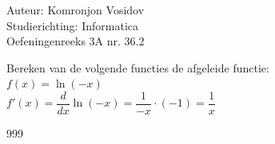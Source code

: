 \documentclass[a4paper]{article}
\begin{document}
	
	\noindent \large Auteur: Komronjon Vosidov \\
	\noindent \large Studierichting: Informatica\\
	\noindent \large Oefeningenreeks 3A nr. 36.2\\
	
	\medskip
	
	\normalsize
	Bereken van de volgende functies de afgeleide functie:\\
	
	$f(x) = \ln(-x)$\\
	
	$f'(x) = \dfrac{d}{dx} \ln(-x) = \dfrac{1}{-x} \cdot (-1) = \dfrac{1}{x}$
	
	
	\begin{thebibliography}{999}
	\end{thebibliography}	
	
\end{document}
